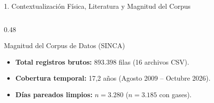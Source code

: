 \documentclass[aspectratio=169, 9pt]{beamer}
\begin{document}
\begin{frame}{1. Contextualización Física, Literatura y Magnitud del Corpus}
\begin{columns}[T]
\begin{column}{0.48\textwidth}
    \begin{block}{\footnotesize Magnitud del Corpus de Datos (SINCA)}
      \scriptsize
      \begin{itemize}\setlength{\itemsep}{2pt}
        \item \textbf{Total registros brutos:} $893.398$ filas (16 archivos CSV).
        \item \textbf{Cobertura temporal:} 17,2 años (Agosto 2009 – Octubre 2026).
        \item \textbf{Días pareados limpios:} $n = \mathbf{3.280}$ ($n = \mathbf{3.185}$ con gases).
      \end{itemize}
    \end{block}
  \end{column}
\end{columns}
\end{frame}
\end{document}
